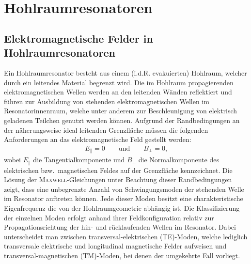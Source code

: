 \chapter{Hohlraumresonatoren}
\label{sec:hohlraumresonatoren}


\section{Elektromagnetische Felder in Hohlraumresonatoren}
Ein Hohlraumresonator besteht aus einem (i.d.R. evakuierten) Hohlraum, welcher durch ein leitendes Material begrenzt wird.
Die im Hohlraum propagierenden elektromagnetischen Wellen werden an den leitenden Wänden reflektiert und führen zur Ausbildung von stehenden elektromagnetischen Wellen im Resonatorinnenraum, welche unter anderem zur Beschleunigung von elektrisch geladenen Teilchen genutzt werden können.
Aufgrund der Randbedingungen an der näherungsweise ideal leitenden Grenzfläche müssen die folgenden Anforderungen an das elektromagnetische Feld gestellt werden:
\begin{align}
  E_\parallel = 0 \qquad \text{und} \qquad B_\perp = 0\text{,}
  \label{eq:randbedingung_leiter}
\end{align}
wobei $E_\parallel$ die Tangentialkomponente und $B_\perp$ die Normalkomponente des elektrischen bzw.\ magnetischen Feldes auf der Grenzfläche kennzeichnet.
Die Lösung der \textsc{Maxwell}-Gleichungen unter Beachtung dieser Randbedingungen zeigt, dass eine unbegrenzte Anzahl von Schwingungsmoden der stehenden Welle im Resonator auftreten können.
Jede dieser Moden besitzt eine charakteristische Eigenfrequenz die von der Hohlraumgeometrie abhängig ist. 
Die Klassifizierung der einzelnen Moden erfolgt anhand ihrer Feldkonfiguration relativ zur Propagationsrichtung der hin- und rücklaufenden Wellen im Resonator.
Dabei unterscheidet man zwischen transversal-elektrischen (TE)-Moden, welche lediglich transversale elektrische und longitudinal magnetische Felder aufweisen und transversal-magnetischen (TM)-Moden, bei denen der umgekehrte Fall vorliegt.

